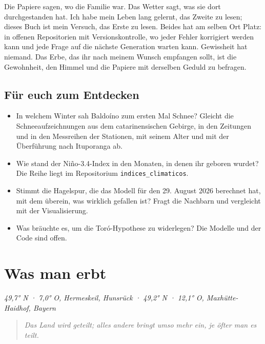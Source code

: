 \documentclass[
  ngerman,
  11pt,
  openany]{book}
\providecommand{\tightlist}{%
  \setlength{\itemsep}{0pt}\setlength{\parskip}{0pt}}
\begin{document}
Die Papiere sagen, wo die Familie war. Das Wetter sagt, was sie dort
durchgestanden hat. Ich habe mein Leben lang gelernt, das Zweite zu
lesen; dieses Buch ist mein Versuch, das Erste zu lesen. Beides hat am
selben Ort Platz: in offenen Repositorien mit Versionskontrolle, wo
jeder Fehler korrigiert werden kann und jede Frage auf die nächste
Generation warten kann. Gewissheit hat niemand. Das Erbe, das ihr nach
meinem Wunsch empfangen sollt, ist die Gewohnheit, den Himmel und die
Papiere mit derselben Geduld zu befragen.

\section{Für euch zum Entdecken}\label{fuxfcr-euch-zum-entdecken-13}

\begin{itemize}
\tightlist
\item
  In welchem Winter sah Baldoíno zum ersten Mal Schnee? Gleicht die
  Schneeaufzeichnungen aus dem catarinensischen Gebirge, in den
  Zeitungen und in den Messreihen der Stationen, mit seinem Alter und
  mit der Überführung nach Ituporanga ab.
\item
  Wie stand der Niño-3.4-Index in den Monaten, in denen ihr geboren
  wurdet? Die Reihe liegt im Repositorium \texttt{indices\_climaticos}.
\item
  Stimmt die Hagelspur, die das Modell für den 29. August 2026 berechnet
  hat, mit dem überein, was wirklich gefallen ist? Fragt die Nachbarn
  und vergleicht mit der Visualisierung.
\item
  Was bräuchte es, um die Toró-Hypothese zu widerlegen? Die Modelle und
  der Code sind offen.
\end{itemize}

\chapter{Was man erbt}\label{cap-15}

\emph{49,7° N · 7,0° O, Hermeskeil, Hunsrück · 49,2° N · 12,1° O,
Maxhütte-Haidhof, Bayern}

\begin{quote}
\emph{Das Land wird geteilt; alles andere bringt umso mehr ein, je öfter
man es teilt.}
\end{quote}
\end{document}
